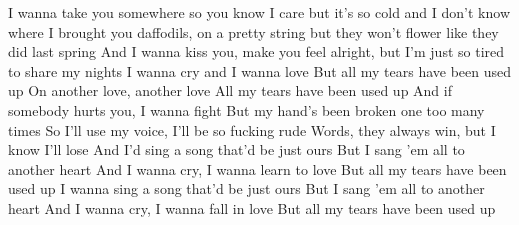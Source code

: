 \ve{}
I wanna take you somewhere so you know I care
but it's so cold and I don't know where
I brought you daffodils, on a pretty string
but they won't flower like they did last spring
And I wanna kiss you, make you feel alright,
but I'm just so tired to share my nights
I wanna cry and I wanna love
But all my tears have been used up
\cho{}
On another love, another love
All my tears have been used up 
\ve{}
And if somebody hurts you, I wanna fight
But my hand's been broken one too many times
So I'll use my voice, I'll be so fucking rude
Words, they always win, but I know I'll lose
\ve{}
And I'd sing a song that'd be just ours
But I sang 'em all to another heart
And I wanna cry, I wanna learn to love
But all my tears have been used up
\cho{}
\ve{}
I wanna sing a song that'd be just ours
But I sang 'em all to another heart
And I wanna cry, I wanna fall in love
But all my tears have been used up
\cho{}
\esong{}